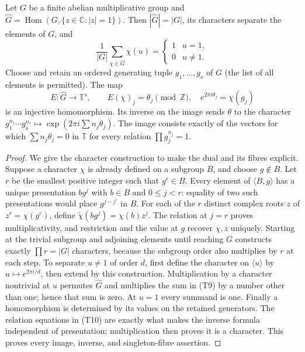 \begin{lemma}
\label{lem:ns-finite-dual}
Let $G$ be a finite abelian multiplicative group and
$\widehat G=\operatorname{Hom}(G,\{z\in\mathbb C:|z|=1\})$.
Then $|\widehat G|=|G|$, its characters separate the elements of
$G$, and
\[
 \frac1{|G|}\sum_{\chi\in\widehat G}\chi(u)
      =\begin{cases}1&u=1,\\0&u\ne1.\end{cases}       \tag{T9}
\]
Choose and retain an ordered generating tuple $g_1,\ldots,g_s$ of
$G$ (the list of all elements is permitted). The map
\[
 E:\widehat G\to\mathbb T^s,\qquad
 E(\chi)_j=\theta_j\pmod{\mathbb Z},\quad
       e^{2\pi i\theta_j}=\chi(g_j)                  \tag{T10}
\]
is an injective homomorphism. Its inverse on the image sends
$\theta$ to the character
$g_1^{n_1}\cdots g_s^{n_s}\mapsto
\exp(2\pi i\sum n_j\theta_j)$. The image consists exactly of
the vectors for which $\sum n_j\theta_j=0$ in $\mathbb T$
for every relation $\prod g_j^{n_j}=1$.
\end{lemma}
\begin{proof}
We give the character construction to make the dual and its fibres
explicit. Suppose a character $\chi$ is already defined on a
subgroup $B$, and choose $g\notin B$. Let $r$ be the smallest
positive integer such that $g^r\in B$. Every element of
$\langle B,g\rangle$ has a unique presentation $bg^j$ with
$b\in B$ and $0\leq j<r$: equality of two such presentations
would place $g^{j-j'}$ in $B$. For each of the $r$ distinct complex
roots $z$ of $z^r=\chi(g^r)$, define
$\widetilde\chi(bg^j)=\chi(b)z^j$.
The relation at $j=r$ proves multiplicativity, and restriction and
the value at $g$ recover $\chi,z$ uniquely. Starting at the trivial
subgroup and adjoining elements until reaching $G$ constructs
exactly $\prod r=|G|$ characters, because the subgroup order also
multiplies by $r$ at each step. To separate $u\ne1$ of order $d$,
first define the character on $\langle u\rangle$ by
$u\mapsto e^{2\pi i/d}$, then extend by this construction.
Multiplication by a character nontrivial at $u$ permutes
$\widehat G$ and multiplies the sum in (T9) by a number other
than one; hence that sum is zero. At $u=1$ every summand is one.
Finally a homomorphism is determined by its values on the retained
generators. The relation equations in (T10) are exactly what makes
the inverse formula independent of presentation; multiplication
then proves it is a character. This proves every image, inverse,
and singleton-fibre assertion.
\end{proof}

